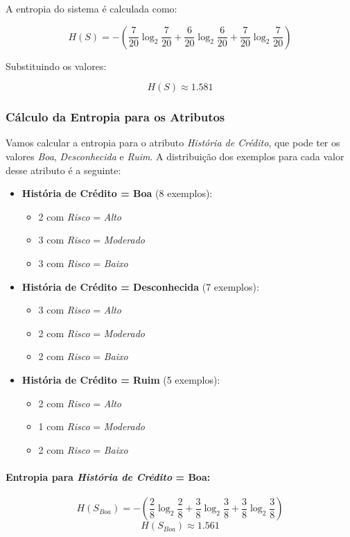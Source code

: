 \documentclass[a4paper,12pt]{article}
\begin{document}
A entropia do sistema é calculada como:

\[
H(S) = -\left(\frac{7}{20} \log_2 \frac{7}{20} + \frac{6}{20} \log_2 \frac{6}{20} + \frac{7}{20} \log_2 \frac{7}{20}\right)
\]

Substituindo os valores:

\[
H(S) \approx 1.581
\]

\subsubsection{Cálculo da Entropia para os Atributos}
Vamos calcular a entropia para o atributo \textit{História de Crédito}, que pode ter os valores \textit{Boa}, \textit{Desconhecida} e \textit{Ruim}. A distribuição dos exemplos para cada valor desse atributo é a seguinte:

\begin{itemize}
    \item \textbf{História de Crédito = Boa} (8 exemplos): 
    \begin{itemize}
        \item 2 com \textit{Risco} = \textit{Alto}
        \item 3 com \textit{Risco} = \textit{Moderado}
        \item 3 com \textit{Risco} = \textit{Baixo}
    \end{itemize}
    
    \item \textbf{História de Crédito = Desconhecida} (7 exemplos):
    \begin{itemize}
        \item 3 com \textit{Risco} = \textit{Alto}
        \item 2 com \textit{Risco} = \textit{Moderado}
        \item 2 com \textit{Risco} = \textit{Baixo}
    \end{itemize}
    
    \item \textbf{História de Crédito = Ruim} (5 exemplos):
    \begin{itemize}
        \item 2 com \textit{Risco} = \textit{Alto}
        \item 1 com \textit{Risco} = \textit{Moderado}
        \item 2 com \textit{Risco} = \textit{Baixo}
    \end{itemize}
\end{itemize}

\paragraph{Entropia para \textit{História de Crédito} = Boa:}
\[
H(S_{Boa}) = -\left(\frac{2}{8} \log_2 \frac{2}{8} + \frac{3}{8} \log_2 \frac{3}{8} + \frac{3}{8} \log_2 \frac{3}{8}\right)
\]
\[
H(S_{Boa}) \approx 1.561
\]
\end{document}
